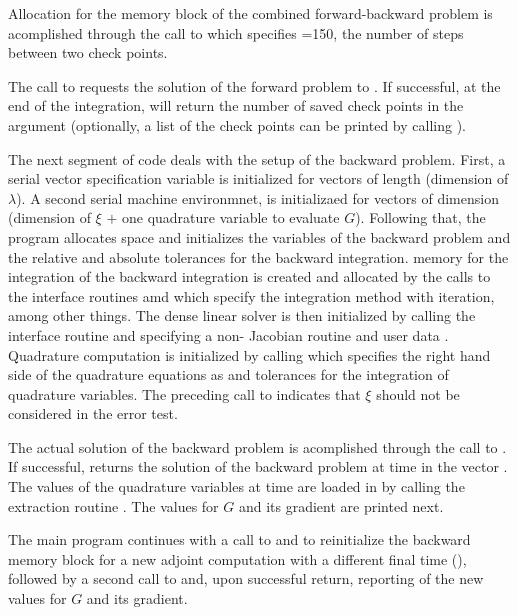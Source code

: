 Allocation for the memory block of the combined forward-backward problem is
acomplished through the call to  which specifies =150,
the number of steps between two check points.

The call to  requests the solution of the forward problem to .
If successful, at the end of the integration,  will return the number
of saved check points in the argument  (optionally, a list of the check points
can be printed by calling ).

The next segment of code deals with the setup of the backward problem. First,
a serial vector specification variable  is initialized for vectors
of length  (dimension of $\lambda$). A second serial
machine environmnet,  is initializaed for vectors of
dimension  (dimension of $\xi$ $+$ one quadrature variable to evaluate $G$).
Following that, the program allocates space and initializes the variables of the 
backward problem and the relative and absolute tolerances for the backward integration.
{\cvodes} memory for the integration of the backward integration is created and allocated
by the calls to the interface routines  amd  which 
specify the  integration method with  iteration, among other things.
The dense linear solver {\cvdense} is then initialized by calling the 
interface routine and specifying a non- Jacobian routine  and user data
.
Quadrature computation is initialized by calling 
which specifies the right hand side of the quadrature equations as  and tolerances
for the integration of quadrature variables.
The preceding call to  indicates that $\xi$ should not be considered 
in the error test.

The actual solution of the backward problem is acomplished through the call to
. If successful,  returns the solution of the backward 
problem at time  in the vector . The values of the quadrature
variables at time  are loaded in  by calling the extraction
routine . The values for $G$ and its gradient are printed next.

The main program continues with a call to  and
 to reinitialize the 
backward memory block for a new adjoint computation with a different final 
time (), followed by a second call to  and, upon successful
return, reporting of the new values for $G$ and its gradient.

